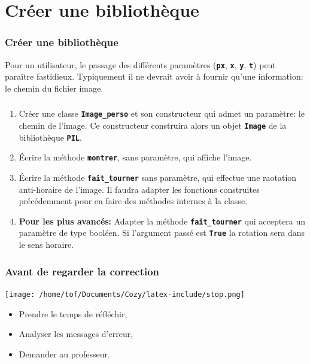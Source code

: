 \documentclass[svgnames,11pt]{beamer}
\begin{document}
\section{Créer une bibliothèque}
\begin{frame}
    \frametitle{Créer une bibliothèque}

    Pour un utilisateur, le passage des différents paramètres (\textbf{\texttt{px}}, \textbf{\texttt{x}}, \textbf{\texttt{y}}, \textbf{\texttt{t}}) peut paraître fastidieux. Typiquement il ne devrait avoir à fournir qu'une information: le chemin du fichier image.

\end{frame}
\begin{frame}
    \frametitle{}

    \begin{activite}
        \begin{enumerate}
            \item Créer une classe \textbf{\texttt{Image\_perso}} et son constructeur qui admet un paramètre: le chemin de l'image. Ce constructeur construira alors un objet \textbf{\texttt{Image}} de la bibliothèque \textbf{\texttt{PIL}}.
            \item Écrire la méthode \textbf{\texttt{montrer}}, sans paramètre, qui affiche l'image.
            \item Écrire la méthode \textbf{\texttt{fait\_tourner}} sans paramètre, qui effectue une raotation anti-horaire de l'image. Il faudra adapter les fonctions construites précédemment pour en faire des méthodes internes à la classe.
            \item \textbf{Pour les plus avancés:} Adapter la méthode \textbf{\texttt{fait\_tourner}} qui acceptera un paramètre de type booléen. Si l'argument passé est \textbf{\texttt{True}} la rotation sera dans le sens horaire.
        \end{enumerate}
    \end{activite}

\end{frame}
\begin{frame}
    \frametitle{Avant de regarder la correction}
    \begin{center}
        \centering
        \texttt{[image: /home/tof/Documents/Cozy/latex-include/stop.png]}
    \end{center}
    {\Large
    \begin{itemize}
        \item Prendre le temps de réfléchir,
        \item Analyser les messages d'erreur,
        \item Demander au professeur.
    \end{itemize}
    }
\end{frame}
\end{document}
